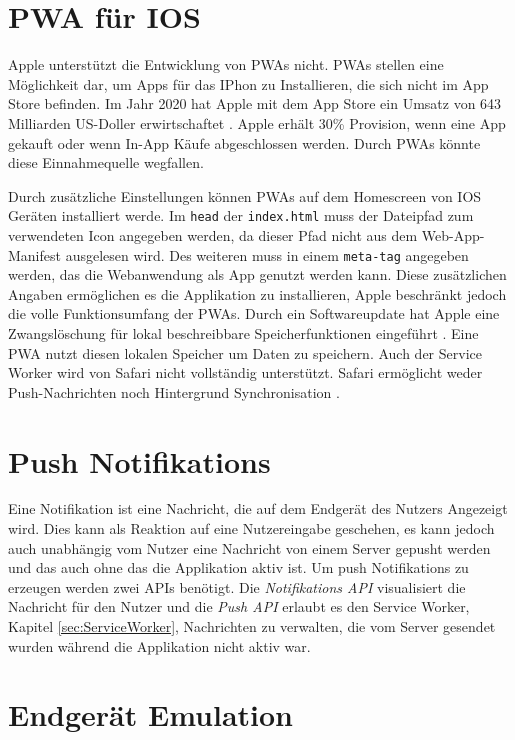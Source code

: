 \section{PWA für IOS}

Apple unterstützt die Entwicklung von PWAs nicht. PWAs stellen  eine Möglichkeit dar, um Apps für das IPhon zu Installieren, die sich nicht im App Store befinden. Im Jahr 2020 hat Apple mit dem App Store ein Umsatz von 643 Milliarden US-Doller erwirtschaftet \cite{Kirchenbauer2021}. Apple erhält 30\% Provision, wenn eine App gekauft oder wenn In-App Käufe abgeschlossen werden. Durch PWAs könnte diese Einnahmequelle wegfallen. 

Durch zusätzliche Einstellungen können PWAs auf dem Homescreen von IOS Geräten installiert werde. Im \texttt{head} der \texttt{index.html} muss der Dateipfad zum verwendeten Icon angegeben werden, da dieser Pfad nicht aus dem Web-App-Manifest ausgelesen wird. 
Des weiteren muss in einem \texttt{meta-tag} angegeben werden, das die Webanwendung als App genutzt werden kann. Diese zusätzlichen Angaben ermöglichen es die Applikation zu installieren, Apple beschränkt jedoch die volle Funktionsumfang der PWAs. Durch ein Softwareupdate hat Apple eine Zwangslöschung für lokal beschreibbare Speicherfunktionen eingeführt \cite{t3n2020}. Eine PWA nutzt diesen lokalen Speicher um Daten zu speichern. 
Auch der Service Worker wird von Safari nicht vollständig unterstützt. Safari ermöglicht weder Push-Nachrichten noch Hintergrund Synchronisation \cite{mediaevent}. 

\section{Push Notifikations}

Eine Notifikation ist eine Nachricht, die auf dem Endgerät des Nutzers Angezeigt wird. Dies kann als Reaktion auf eine Nutzereingabe geschehen, es kann jedoch auch unabhängig vom Nutzer eine Nachricht von einem Server \glqq gepusht\grqq{} werden und das auch ohne das die Applikation aktiv ist.  Um push Notifikations zu erzeugen werden zwei APIs benötigt. Die \textit{Notifikations API} visualisiert die Nachricht für den Nutzer und die \textit{Push API} erlaubt es den Service Worker, Kapitel \ref{sec:ServiceWorker}, Nachrichten zu verwalten, die vom Server gesendet wurden während die Applikation nicht aktiv war. 

\section{Endgerät Emulation }

